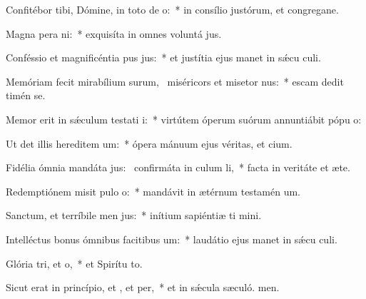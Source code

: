 \item Confitébor tibi, Dómine, in toto de o:~* in consílio justórum, et congregane.
\item Magna pera ni:~* exquisíta in omnes voluntá jus.
\item Conféssio et magnificéntia pus jus:~* et justítia ejus manet in sǽcu culi.
\item Memóriam fecit mirabílium surum,~\pscross{} miséricors et misetor nus:~* escam dedit timén se.
\item Memor erit in sǽculum testati i:~* virtútem óperum suórum annuntiábit pópu o:
\item Ut det illis hereditem um:~* ópera mánuum ejus véritas, et cium.
\item Fidélia ómnia mandáta jus:~\pscross{} confirmáta in culum li,~* facta in veritáte et æte.
\item Redemptiónem misit pulo o:~* mandávit in ætérnum testamén um.
\item Sanctum, et terríbile men jus:~* inítium sapiéntiæ ti mini.
\item Intelléctus bonus ómnibus facitibus um:~* laudátio ejus manet in sǽcu culi.
\item Glória tri, et o,~* et Spirítu to.
\item Sicut erat in princípio, et , et per,~* et in sǽcula sæculó. men.
